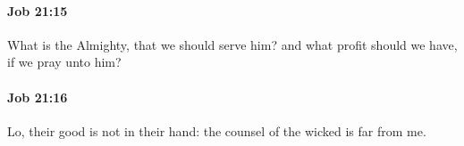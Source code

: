 		\paragraph{Job 21:15} %
			\label{JOB-21-15}

			What is the Almighty, that we should serve him? and what profit should we have, if we pray unto him?


		\paragraph{Job 21:16} %
			\label{JOB-21-16}

			Lo, their good is not in their hand: the counsel of the wicked is far from me.


